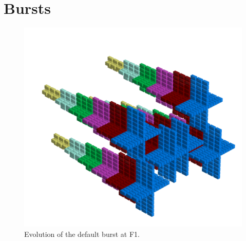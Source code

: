 \chapter{Bursts} 
\lstset{style=6502Style}


\clearpage
\begin{figure}[H]
    \centering
    \begin{adjustbox}{width=12cm,center}
      \includegraphics[width=12cm]{src/patterns/bursts/pattern0-45.png}%
    \end{adjustbox}
\caption{Evolution of the default burst at F1.}
\end{figure}
\clearpage

